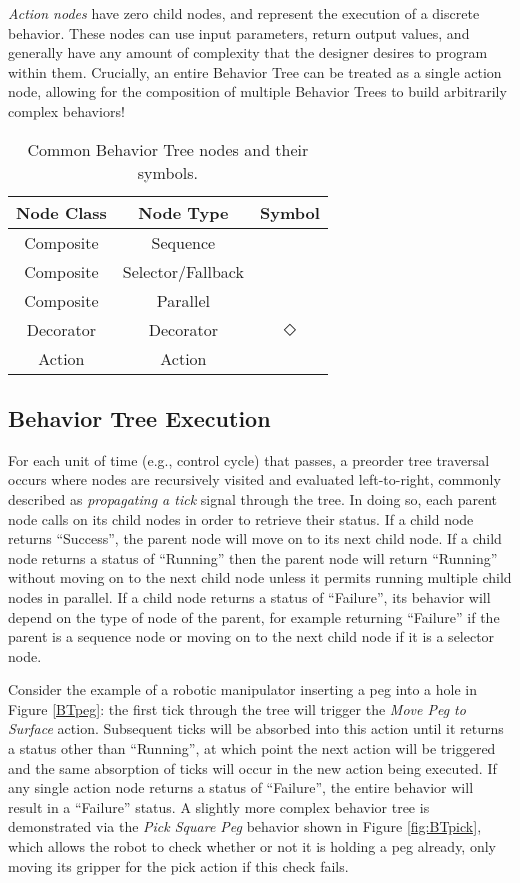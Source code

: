 \emph{Action nodes} have zero child nodes, and represent the execution of a discrete behavior. These nodes can use input parameters, return output values, and generally have any amount of complexity that the designer desires to program within them. Crucially, an entire Behavior Tree can be treated as a single action node, allowing for the composition of multiple Behavior Trees to build arbitrarily complex behaviors!

\begin{table}[h!]
	\centering
	\begin{tabular}{ ||c c c|| }
		\hline
		\hline
		Node Class & Node Type & Symbol \\
		\hline
		Composite & Sequence & \fbox{$\rightarrow$} \\
		Composite & Selector/Fallback & \fbox{?} \\
		Composite & Parallel & \fbox{$\rightrightarrows$} \\
		Decorator & Decorator & $\Diamond$ \\
		Action & Action & \fbox{Text} \\
		\hline
		\hline
	\end{tabular}
	\caption{Common Behavior Tree nodes and their symbols.}
\end{table}

\subsection{Behavior Tree Execution}
For each unit of time (e.g., control cycle) that passes, a preorder tree traversal occurs where nodes are recursively visited and evaluated left-to-right, commonly described as \emph{propagating a tick} signal through the tree. In doing so, each parent node calls on its child nodes in order to retrieve their status. If a child node returns ``Success'', the parent node will move on to its next child node. If a child node returns a status of ``Running'' then the parent node will return ``Running'' without moving on to the next child node unless it permits running multiple child nodes in parallel. If a child node returns a status of ``Failure'', its behavior will depend on the type of node of the parent, for example returning ``Failure'' if the parent is a sequence node or moving on to the next child node if it is a selector node. 

Consider the example of a robotic manipulator inserting a peg into a hole in Figure \ref{BTpeg}: the first tick through the tree will trigger the \emph{Move Peg to Surface} action. Subsequent ticks will be absorbed into this action until it returns a status other than ``Running'', at which point the next action will be triggered and the same absorption of ticks will occur in the new action being executed. If any single action node returns a status of ``Failure'', the entire behavior will result in a ``Failure'' status. A slightly more complex behavior tree is demonstrated via the \emph{Pick Square Peg} behavior shown in Figure \ref{fig:BTpick}, which allows the robot to check whether or not it is holding a peg already, only moving its gripper for the pick action if this check fails.

